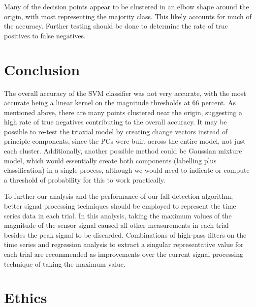 \documentclass{llncs}
\begin{document}
    Many of the decision points appear to be clustered in an elbow shape around the origin, with most representing the majority class. This likely accounts for much of the accuracy. Further testing should be done to determine the rate of true positives to false negatives.
    
\section{Conclusion}

The overall accuracy of the SVM classifier was not very accurate, with the most accurate being a linear kernel on the magnitude thresholds at 66 percent. As mentioned above, there are many points clustered near the origin, suggesting a high rate of true negatives contributing to the overall accuracy. It may be possible to re-test the triaxial model by creating change vectors instead of principle components, since the PCs were built across the entire model, not just each cluster. Additionally, another possible method could be Gaussian mixture model, which would essentially create both components (labelling plus classification) in a single process, although we would need to indicate or compute a threshold of probability for this to work practically.

To further our analysis and the performance of our fall detection algorithm, better signal processing techniques should be employed to represent the time series data in each trial. In this analysis, taking the maximum values of the magnitude of the sensor signal caused all other measurements in each trial besides the peak signal to be discarded. Combinations of high-pass filters on the time series and regression analysis to extract a singular representative value for each trial are recommended as improvements over the current signal processing technique of taking the maximum value. 


\section{Ethics}
\end{document}
